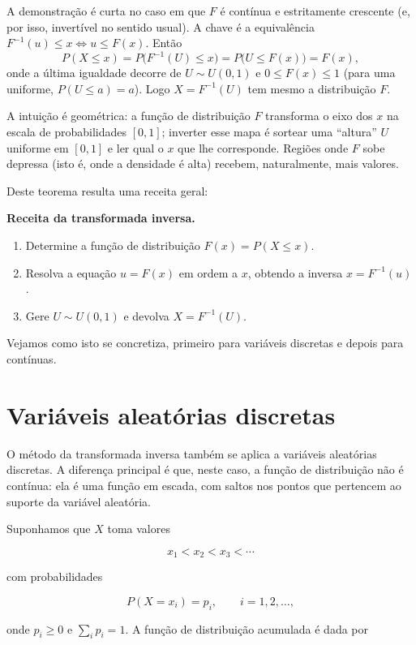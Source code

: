 \documentclass[
  portuguese,
  11pt,
  openany]{book}
\providecommand{\tightlist}{%
  \setlength{\itemsep}{0pt}\setlength{\parskip}{0pt}}
\begin{document}
A demonstração é curta no caso em que \(F\) é contínua e estritamente crescente (e, por
isso, invertível no sentido usual). A chave é a equivalência \(F^{-1}(u) \leq x \iff u \leq F(x)\).
Então
\[P(X \leq x) = P\big(F^{-1}(U) \leq x\big) = P\big(U \leq F(x)\big) = F(x),\]
onde a última igualdade decorre de \(U \sim U(0, 1)\) e \(0 \leq F(x) \leq 1\) (para uma
uniforme, \(P(U \leq a) = a\)). Logo \(X = F^{-1}(U)\) tem mesmo a distribuição \(F\).

A intuição é geométrica: a função de distribuição \(F\) transforma o eixo dos \(x\) na escala
de probabilidades \([0, 1]\); inverter esse mapa é sortear uma ``altura'' \(U\) uniforme em
\([0, 1]\) e ler qual o \(x\) que lhe corresponde. Regiões onde \(F\) sobe depressa (isto é,
onde a densidade é alta) recebem, naturalmente, mais valores.

Deste teorema resulta uma receita geral:

\textbf{Receita da transformada inversa.}

\begin{enumerate}
\def\labelenumi{\arabic{enumi}.}
\tightlist
\item
  Determine a função de distribuição \(F(x) = P(X \leq x)\).
\item
  Resolva a equação \(u = F(x)\) em ordem a \(x\), obtendo a inversa \(x = F^{-1}(u)\).
\item
  Gere \(U \sim U(0, 1)\) e devolva \(X = F^{-1}(U)\).
\end{enumerate}

Vejamos como isto se concretiza, primeiro para variáveis discretas e depois para
contínuas.

\section{Variáveis aleatórias discretas}\label{variuxe1veis-aleatuxf3rias-discretas}

O método da transformada inversa também se aplica a variáveis aleatórias discretas. A
diferença principal é que, neste caso, a função de distribuição não é contínua: ela é uma
função em escada, com saltos nos pontos que pertencem ao suporte da variável aleatória.

Suponhamos que \(X\) toma valores

\[
x_1 < x_2 < x_3 < \cdots
\]

com probabilidades

\[
P(X=x_i)=p_i, \qquad i=1,2,\ldots,
\]

onde \(p_i\geq 0\) e \(\sum_i p_i=1\). A função de distribuição acumulada é dada por
\end{document}
